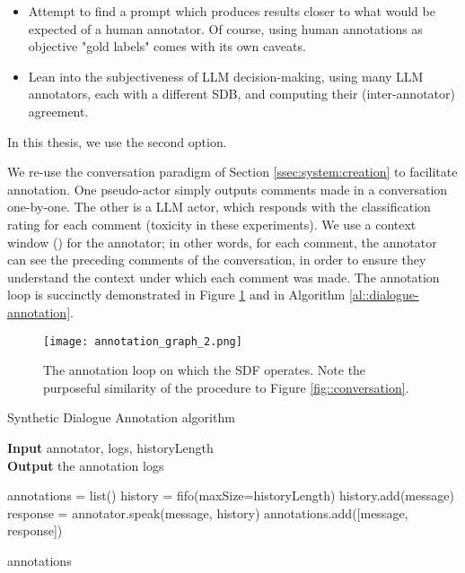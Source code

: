 \begin{itemize}
	\item Attempt to find a prompt which produces results closer to what would be expected of a human annotator. Of course, using human annotations as objective "gold labels" comes with its own caveats.
	\item Lean into the subjectiveness of LLM decision-making, using many LLM annotators, each with a different \ac{SDB}, and computing their (inter-annotator) agreement.
\end{itemize}

In this thesis, we use the second option.

We re-use the conversation paradigm of Section \ref{ssec:system:creation} to facilitate annotation. One pseudo-actor simply outputs comments made in a conversation one-by-one. The other is a LLM actor, which responds with the classification rating for each comment (toxicity in these experiments).  We use a context window  () for the annotator; in other words, for each comment, the annotator can see the  preceding comments of the conversation, in order to ensure they understand the context under which each comment was made. The annotation loop is succinctly demonstrated in Figure \ref{fig::annotation} and in Algorithm \ref{al::dialogue-annotation}.

\begin{figure}
	\centering
	\texttt{[image: annotation\_graph\_2.png]}
	\caption{The annotation loop on which the \ac{SDF} operates. Note the purposeful similarity of the procedure to Figure \ref{fig::conversation}.}
	\label{fig::annotation}
\end{figure}

\begin{algorithm}
	\caption{Synthetic Dialogue Annotation algorithm} 
	\label{al::dialogue-annotation}
	\hspace*{\algorithmicindent} \textbf{Input} annotator, logs, historyLength\\
	\hspace*{\algorithmicindent} \textbf{Output} the annotation logs
	\begin{algorithmic}[1]	
		\State annotations = list()
		\State history = fifo(maxSize=historyLength)
		\State 
		\State history.add(message)
		\State response = annotator.speak(message, history)
		\State annotations.add([message, response])
		\EndFor
		
		\State \Return annotations
	\end{algorithmic} 
\end{algorithm}


